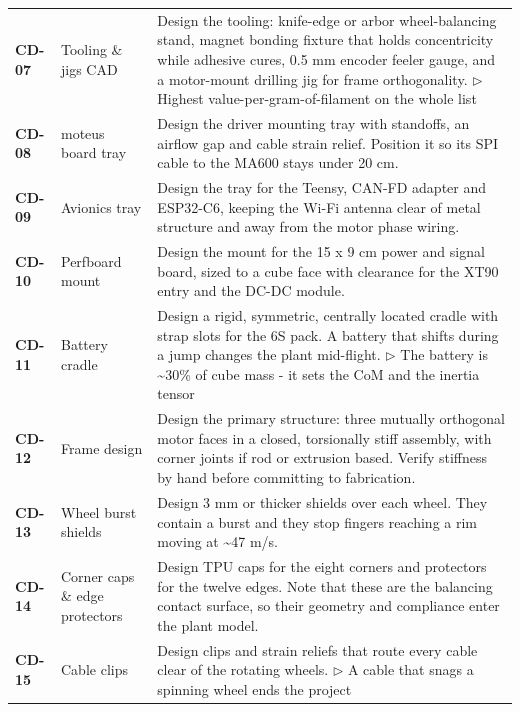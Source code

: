 {\begin{longtable}{@{}L{1.1cm} L{3.0cm} L{11.0cm}@{}}
\textbf{CD-07} & Tooling \& jigs CAD & Design the tooling: knife-edge or arbor wheel-balancing stand, magnet bonding fixture that holds concentricity while adhesive cures, 0.5 mm encoder feeler gauge, and a motor-mount drilling jig for frame orthogonality. \newline\textcolor{p0col}{\footnotesize$\triangleright$ Highest value-per-gram-of-filament on the whole list} \\[2pt]
\textbf{CD-08} & moteus board tray & Design the driver mounting tray with standoffs, an airflow gap and cable strain relief. Position it so its SPI cable to the MA600 stays under 20 cm. \\[2pt]
\textbf{CD-09} & Avionics tray & Design the tray for the Teensy, CAN-FD adapter and ESP32-C6, keeping the Wi-Fi antenna clear of metal structure and away from the motor phase wiring. \\[2pt]
\textbf{CD-10} & Perfboard mount & Design the mount for the 15 x 9 cm power and signal board, sized to a cube face with clearance for the XT90 entry and the DC-DC module. \\[2pt]
\textbf{CD-11} & Battery cradle & Design a rigid, symmetric, centrally located cradle with strap slots for the 6S pack. A battery that shifts during a jump changes the plant mid-flight. \newline\textcolor{p0col}{\footnotesize$\triangleright$ The battery is \textasciitilde{}30\% of cube mass - it sets the CoM and the inertia tensor} \\[2pt]
\textbf{CD-12} & Frame design & Design the primary structure: three mutually orthogonal motor faces in a closed, torsionally stiff assembly, with corner joints if rod or extrusion based. Verify stiffness by hand before committing to fabrication. \\[2pt]
\textbf{CD-13} & Wheel burst shields & Design 3 mm or thicker shields over each wheel. They contain a burst and they stop fingers reaching a rim moving at \textasciitilde{}47 m/s. \\[2pt]
\textbf{CD-14} & Corner caps \& edge protectors & Design TPU caps for the eight corners and protectors for the twelve edges. Note that these are the balancing contact surface, so their geometry and compliance enter the plant model. \\[2pt]
\textbf{CD-15} & Cable clips & Design clips and strain reliefs that route every cable clear of the rotating wheels. \newline\textcolor{p0col}{\footnotesize$\triangleright$ A cable that snags a spinning wheel ends the project} \\[2pt]

\end{longtable}}
